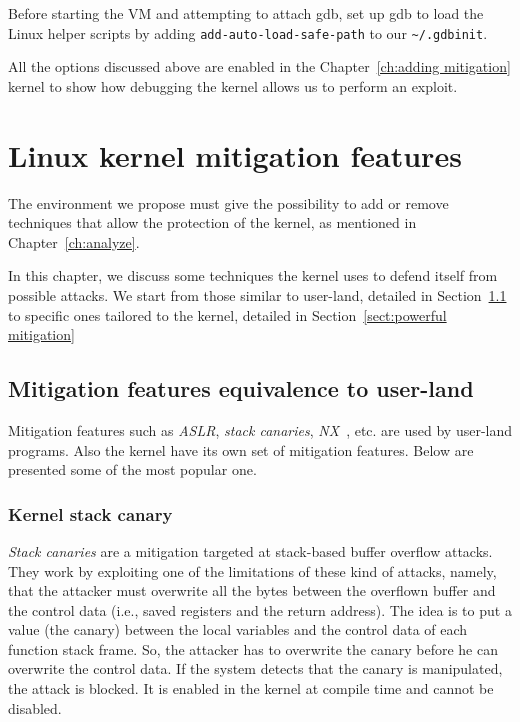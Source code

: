 \documentclass{masterthesis}
\newcommand{\refToChapter}[1]{Chapter~\ref{ch:#1}\xspace}
\newcommand{\refToSection}[1]{Section~\ref{sect:#1}\xspace}
\begin{document}
Before starting the VM and attempting to attach gdb, set up gdb to load the Linux helper scripts by adding \lstinline[language={}]{add-auto-load-safe-path} to our \lstinline{~/.gdbinit}.

All the options discussed above are enabled in the \refToChapter{adding mitigation} kernel to show how debugging the kernel allows us to perform an exploit.

\chapter{Linux kernel mitigation features}
\label{ch:mitigation}
The environment we propose must give the possibility to add or remove techniques that allow the protection of the kernel, as mentioned in \refToChapter{analyze}.

In this chapter, we discuss some techniques the kernel uses to defend itself from possible attacks.
We start from those similar to user-land, detailed in \refToSection{like user-land} to specific ones tailored to the kernel, detailed in \refToSection{powerful mitigation}
\section{Mitigation features equivalence to user-land}
\label{sect:like user-land}
Mitigation features such as \emph{ASLR}, \emph{stack canaries}, \emph{NX}~\cite{salwan2014introduction}, etc. are used by user-land programs. Also the kernel have its own set of mitigation features. Below are presented some of the most popular one.

\subsection{Kernel stack canary}
\label{subsect:canary}
\emph{Stack canaries} are a mitigation targeted at stack-based buffer overflow attacks. They work by exploiting one of the limitations of these kind of attacks, namely, that the attacker must overwrite all the bytes between the overflown buffer and the control data (i.e., saved registers and the return address). The idea is to put a value (the canary) between the local variables and the control data of each function stack frame. So, the attacker has to overwrite the canary before he can overwrite the control data. If the system detects that the canary is manipulated, the attack is blocked.
It is enabled in the kernel at compile time and cannot be disabled.
\end{document}
